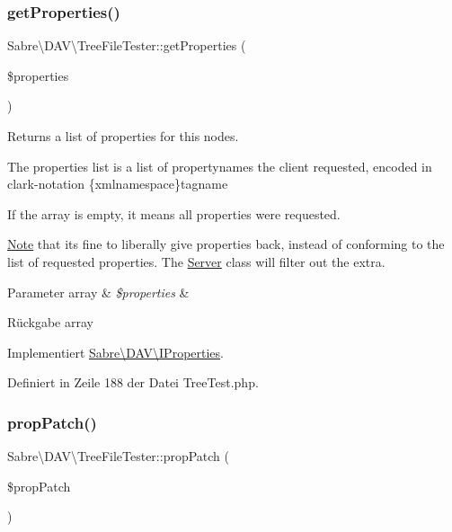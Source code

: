\subsubsection{\texorpdfstring{get\+Properties()}{getProperties()}}
{\footnotesize\ttfamily Sabre\textbackslash{}\+D\+A\+V\textbackslash{}\+Tree\+File\+Tester\+::get\+Properties (\begin{DoxyParamCaption}\item[{}]{\$properties }\end{DoxyParamCaption})}

Returns a list of properties for this nodes.

The properties list is a list of propertynames the client requested, encoded in clark-\/notation \{xmlnamespace\}tagname

If the array is empty, it means \textquotesingle{}all properties\textquotesingle{} were requested.

\mbox{\hyperlink{class_note}{Note}} that it\textquotesingle{}s fine to liberally give properties back, instead of conforming to the list of requested properties. The \mbox{\hyperlink{class_sabre_1_1_d_a_v_1_1_server}{Server}} class will filter out the extra.


\begin{DoxyParams}[1]{Parameter}
array & {\em \$properties} & \\
\hline
\end{DoxyParams}
\begin{DoxyReturn}{Rückgabe}
array 
\end{DoxyReturn}


Implementiert \mbox{\hyperlink{interface_sabre_1_1_d_a_v_1_1_i_properties_a0d2fcaacf74daaa5cf24ea53a057140a}{Sabre\textbackslash{}\+D\+A\+V\textbackslash{}\+I\+Properties}}.



Definiert in Zeile 188 der Datei Tree\+Test.\+php.

\mbox{\label{class_sabre_1_1_d_a_v_1_1_tree_file_tester_a474b2d04545674413ad86531abcc2105}} 
\subsubsection{\texorpdfstring{prop\+Patch()}{propPatch()}}
{\footnotesize\ttfamily Sabre\textbackslash{}\+D\+A\+V\textbackslash{}\+Tree\+File\+Tester\+::prop\+Patch (\begin{DoxyParamCaption}\item[{\mbox{\hyperlink{class_sabre_1_1_d_a_v_1_1_prop_patch}{Prop\+Patch}}}]{\$prop\+Patch }\end{DoxyParamCaption})}


